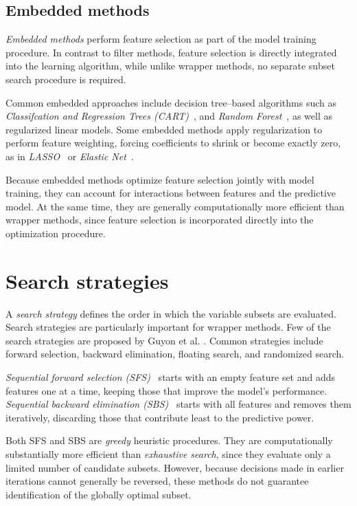\subsection{Embedded methods}
\emph{Embedded methods} perform feature selection as part of the model training procedure. In contrast to filter methods, feature selection is directly integrated into the learning algorithm, while unlike wrapper methods, no separate subset search procedure is required.

Common embedded approaches include decision tree--based algorithms such as \emph{Classifcation and Regression Trees (CART)}~\cite{breiman1984}, and \emph{Random Forest}~\cite{breiman2001}, as well as regularized linear models. Some embedded methods apply regularization to perform feature weighting, forcing coefficients to shrink or become exactly zero, as in \emph{LASSO}~\cite{tibshirani1996} or \emph{Elastic Net}~\cite{zou2005}. 

Because embedded methods optimize feature selection jointly with model training, they can account for interactions between features and the predictive model. At the same time, they are generally computationally more efficient than wrapper methods, since feature selection is incorporated directly into the optimization procedure.

\section{Search strategies}
\label{sec:search-strategies}
A \textit{search strategy} defines the order in which the variable subsets are evaluated. Search strategies are particularly important for wrapper methods. Few of the search strategies are proposed by Guyon et al. \cite{guyon2006}. Common strategies include forward selection, backward elimination, floating search, and randomized search. 

\textit{Sequential forward selection (SFS)}~\cite{jain1997} starts with an empty feature set and adds features one at a time, keeping those that improve the model's performance. \textit{Sequential backward elimination (SBS)}~\cite{jain1997} starts with all features and removes them iteratively, discarding those that contribute least to the predictive power.

Both SFS and SBS are \emph{greedy} heuristic procedures. They are computationally substantially more efficient than \emph{exhaustive search}, since they evaluate only a limited number of candidate subsets. However, because decisions made in earlier iterations cannot generally be reversed, these methods do not guarantee identification of the globally optimal subset.

